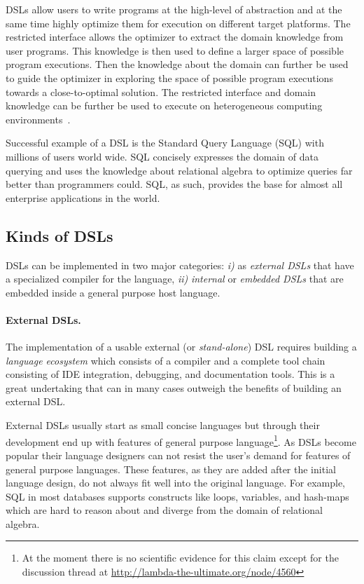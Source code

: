 DSLs allow users to write programs at the high-level of abstraction and at the
 same time highly optimize them for execution on different target platforms. The restricted interface allows the optimizer to extract the domain knowledge from user programs. This knowledge is then used to define a larger space of possible program executions. Then the knowledge about the domain can further be used to guide the optimizer in exploring the space of possible program executions towards a close-to-optimal solution. The restricted interface and domain knowledge can be further be used to execute on heterogeneous computing environments~\cite{chafi_language_2010}.

Successful example of a DSL is the Standard Query Language (SQL) with millions of users world wide.
 SQL concisely expresses the domain of data querying and uses the knowledge about relational  algebra
 to optimize queries far better than programmers could. SQL, as such, provides the base for almost all enterprise applications in the world.

\subsection{Kinds of DSLs}
\label{sec:kinds-of-dsls}

DSLs can be implemented in two major categories: \emph{i)} as \emph{external DSLs} that
 have a specialized compiler for the language, \emph{ii)} \emph{internal} or \emph{embedded DSLs} that are embedded inside a general purpose host language.

\paragraph{External DSLs.} The implementation of a usable external (or \emph{stand-alone}) DSL requires building a \emph{language ecosystem} which consists of a compiler and a complete
tool chain consisting of IDE integration, debugging, and documentation
tools. This is a great undertaking that can in many cases outweigh the
benefits of building an external DSL. %

External DSLs usually start as small concise languages but through their development end up with features of general purpose language\footnote{At the moment there is no scientific evidence for this claim except for the discussion thread at \url{http://lambda-the-ultimate.org/node/4560}}. As DSLs become popular their language designers can not resist the user's demand for features of general purpose languages. These features, as they are added after the initial language design, do not always fit well into the original language. For example, SQL in most databases supports constructs like loops, variables, and hash-maps which are hard to reason about and diverge from the domain of relational algebra.

